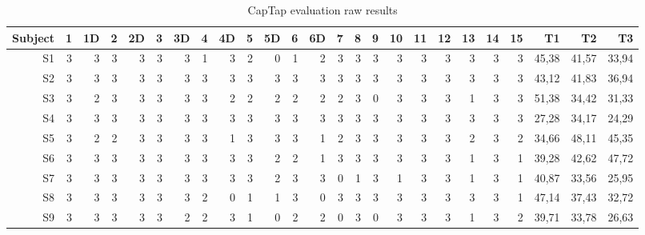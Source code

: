 \begin{landscape}
\begin{table}[htbp]
  \footnotesize
  \centering
  \caption{CapTap evaluation raw results}
    \begin{tabular}{rrrrrrrrrrrrrrrrrrrrrrrrr}
    \toprule
    Subject & 1     & 1D    & 2     & 2D    & 3     & 3D    & 4     & 4D    & 5     & 5D    & 6     & 6D    & 7     & 8     & 9     & 10    & 11    & 12    & 13    & 14    & 15    & T1    & T2    & T3 \\
    \midrule
    S1    & 3     & 3     & 3     & 3     & 3     & 3     & 1     & 3     & 2     & 0     & 1     & 2     & 3     & 3     & 3     & 3     & 3     & 3     & 3     & 3     & 3     & 45,38 & 41,57 & 33,94 \\
    S2    & 3     & 3     & 3     & 3     & 3     & 3     & 3     & 3     & 3     & 3     & 3     & 3     & 3     & 3     & 3     & 3     & 3     & 3     & 3     & 3     & 3     & 43,12 & 41,83 & 36,94 \\
    S3    & 3     & 2     & 3     & 3     & 3     & 3     & 3     & 2     & 2     & 2     & 2     & 2     & 2     & 3     & 0     & 3     & 3     & 3     & 1     & 3     & 3     & 51,38 & 34,42 & 31,33 \\
    S4    & 3     & 3     & 3     & 3     & 3     & 3     & 3     & 3     & 3     & 3     & 3     & 3     & 3     & 3     & 3     & 3     & 3     & 3     & 3     & 3     & 3     & 27,28 & 34,17 & 24,29 \\
    S5    & 3     & 2     & 2     & 3     & 3     & 3     & 3     & 1     & 3     & 3     & 3     & 1     & 2     & 3     & 3     & 3     & 3     & 3     & 2     & 3     & 2     & 34,66 & 48,11 & 45,35 \\
    S6    & 3     & 3     & 3     & 3     & 3     & 3     & 3     & 3     & 3     & 2     & 2     & 1     & 3     & 3     & 3     & 3     & 3     & 3     & 1     & 3     & 1     & 39,28 & 42,62 & 47,72 \\
    S7    & 3     & 3     & 3     & 3     & 3     & 3     & 3     & 3     & 3     & 2     & 3     & 3     & 0     & 1     & 3     & 1     & 3     & 3     & 1     & 3     & 1     & 40,87 & 33,56 & 25,95 \\
    S8    & 3     & 3     & 3     & 3     & 3     & 3     & 2     & 0     & 1     & 1     & 3     & 0     & 3     & 3     & 3     & 3     & 3     & 3     & 3     & 3     & 1     & 47,14 & 37,43 & 32,72 \\
    S9    & 3     & 3     & 3     & 3     & 3     & 2     & 2     & 3     & 1     & 0     & 2     & 2     & 0     & 3     & 0     & 3     & 3     & 3     & 1     & 3     & 2     & 39,71 & 33,78 & 26,63 \\

\end{tabular}
\end{table}
\end{landscape}
